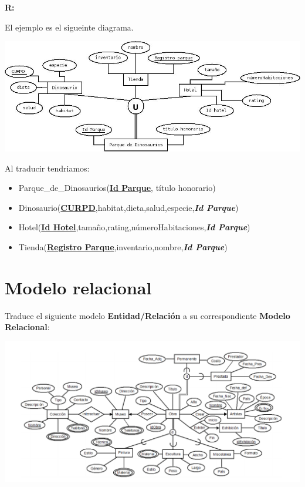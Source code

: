 \documentclass{article}
\begin{document}
\begin{enumerate}[label = \alph*.]
            \textbf{R: }{El ejemplo es el sigueinte diagrama.
                \begin{center}
                    \includegraphics[width=1\textwidth]{catER.png}
                \end{center}
            Al traducir tendriamos:
            \begin{itemize}
                \item Parque\_de\_Dinosaurios(\textbf{\underline{Id Parque}}, título honorario) 
                \item Dinosaurio(\textbf{\underline{CURPD}},habitat,dieta,salud,especie,\textit{\textbf{Id Parque}}) 
                \item Hotel(\textbf{\underline{Id Hotel}},tamaño,rating,númeroHabitaciones,\textit{\textbf{Id Parque}})
                \item Tienda(\textbf{\underline{Registro Parque}},inventario,nombre,\textit{\textbf{Id Parque}})
            \end{itemize}}
    \end{enumerate}
    
    \newpage
    \section{Modelo relacional}
    Traduce el siguiente modelo \textbf{Entidad/Relación} a su correspondiente 
    \textbf{Modelo Relacional}:
    
    \begin{center}
        \includegraphics[width=1\textwidth]{er1.png}
    \end{center}
\end{document}

